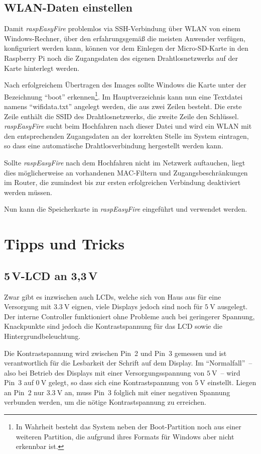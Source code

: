 \documentclass[paper=a4, parskip, numbers=noenddot, toc=listof, headsepline]{scrbook}
\newcommand{\REF}{\emph{raspEasyFire}}
\begin{document}
		\section{WLAN-Daten einstellen}

			Damit {\REF} problemlos via SSH-Verbindung über WLAN von einem Windows-Rechner, über den erfahrungsgemäß die meisten Anwender verfügen, konfiguriert werden kann, können vor dem Einlegen der Micro-SD-Karte in den Raspberry Pi noch die Zugangsdaten des eigenen Drahtlosnetzwerks auf der Karte hinterlegt werden.

			Nach erfolgreichem Übertragen des Images sollte Windows die Karte unter der Bezeichnung \enquote{boot} erkennen\footnote{In Wahrheit besteht das System neben der Boot-Partition noch aus einer weiteren Partition, die aufgrund ihres Formats für Windows aber nicht erkennbar ist.}. Im Hauptverzeichnis kann nun eine Textdatei namens \enquote{wifidata.txt} angelegt werden, die aus zwei Zeilen besteht. Die erste Zeile enthält die SSID des Drahtlosnetzwerks, die zweite Zeile den Schlüssel. {\REF} sucht beim Hochfahren nach dieser Datei und wird ein WLAN mit den entsprechenden Zugangsdaten an der korrekten Stelle im System eintragen, so dass eine automatische Drahtlosverbindung hergestellt werden kann.

			Sollte {\REF} nach dem Hochfahren nicht im Netzwerk auftauchen, liegt dies möglicherweise an vorhandenen MAC-Filtern und Zugangsbeschränkungen im Router, die zumindest bis zur ersten erfolgreichen Verbindung deaktiviert werden müssen.

			Nun kann die Speicherkarte in {\REF} eingeführt und verwendet werden.

	\chapter{Tipps und Tricks}

		\section[5V-LCD an 3,3V]{5\,V-LCD an 3,3\,V}

			Zwar gibt es inzwischen auch LCDs, welche sich von Haus aus für eine Versorgung mit $\SI{3,3}{\volt}$ eignen, viele Displays jedoch sind noch für $\SI{5}{\volt}$ ausgelegt. Der interne Controller funktioniert ohne Probleme auch bei geringerer Spannung, Knackpunkte sind jedoch die Kontrastspannung für das LCD sowie die Hintergrundbeleuchtung.

			Die Kontrastspannung wird zwischen Pin~2 und Pin~3 gemessen und ist verantwortlich für die Lesbarkeit der Schrift auf dem Display. Im \enquote{Normalfall}~-- also bei Betrieb des Displays mit einer Versorgungsspannung von $\SI{5}{\volt}$~-- wird Pin~3 auf $\SI{0}{\volt}$ gelegt, so dass sich eine Kontrastspannung von $\SI{5}{\volt}$ einstellt. Liegen an Pin~2 nur $\SI{3,3}{\volt}$ an, muss Pin~3 folglich mit einer negativen Spannung verbunden werden, um die nötige Kontrastspannung zu erreichen.
\end{document}

